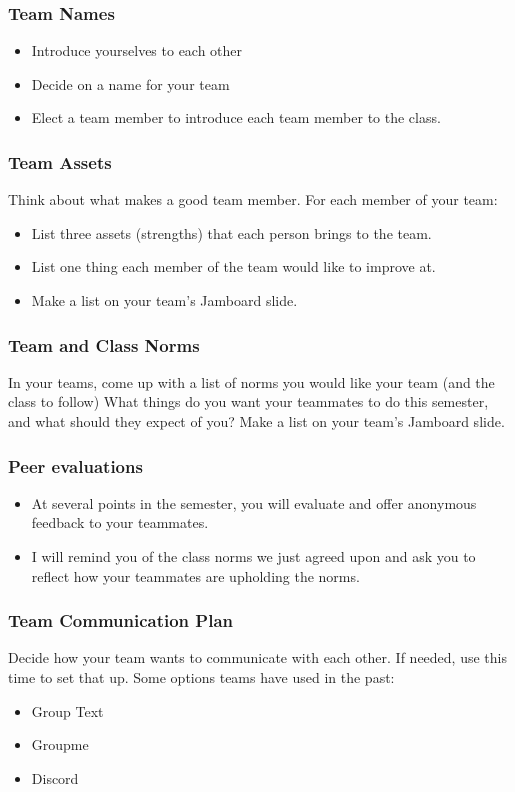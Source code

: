 \documentclass[aspectration=1610]{beamer}
\begin{document}
\begin{frame}\frametitle{Team Names}
\begin{itemize}
\item Introduce yourselves to each other
\item Decide on a name for your team
\item Elect a team member to introduce each team member to the class.
\end{itemize}
\end{frame}

\begin{frame}\frametitle{Team Assets}
Think about what makes a good team member.  For each member of your team:

\begin{itemize}
\item List three assets (strengths) that each person brings to the team.
\pause \item List one thing each member of the team would like to improve at.
\item Make a list on your team's Jamboard slide.
\end{itemize}
\end{frame}


  

\begin{frame}\frametitle{Team and Class Norms}

In your teams, come up with a list of norms you would like your team (and the class to follow)
\vfill
What things do you want your teammates to do this semester, and what should they expect of you?
\vfill
Make a list on your team's Jamboard slide.
\end{frame}

\begin{frame}\frametitle{Peer evaluations}


\begin{itemize}
\item At several points in the semester, you will evaluate and offer anonymous feedback to your teammates.
\item I will remind you of the class norms we just agreed upon and ask you to reflect how your teammates are upholding the norms.
\end{itemize}
\end{frame}

\begin{frame}\frametitle{Team Communication Plan}

Decide how your team wants to communicate with each other. If needed, use this time to set that up.
\vfill
Some options teams have used in the past:
\begin{itemize}
\item Group Text
\item Groupme
\item Discord
\end{itemize}
\end{frame}
\end{document}
